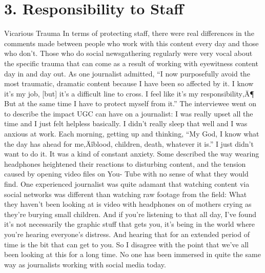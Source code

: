 \documentclass[symmetric, notoc, nobib]{towcenter-book}
\begin{document}
\section{3. Responsibility to Staff}
Vicarious Trauma
In terms of protecting staff, there were real differences in the comments
made between people who work with this content every day and those who
don't. Those who do social newsgathering regularly were very vocal about
the specific trauma that can come as a result of working with eyewitness
content day in and day out. As one journalist admitted, ``I now purposefully
avoid the most traumatic, dramatic content because I have been so affected
by it. I know it's my job, [but] it's a difficult line to cross. I feel like it's my
responsibility‚Ä¶ But at the same time I have to protect myself from it.'' The
interviewee went on to describe the impact UGC can have on a journalist:
I was really upset all the time and I just felt helpless basically. I didn't
really sleep that well and I was anxious at work. Each morning, getting
up and thinking, ``My God, I know what the day has ahead for
me‚Äîblood, children, death, whatever it is.'' I just didn't want to do it.
It was a kind of constant anxiety.
Some described the way wearing headphones heightened their reactions to
disturbing content, and the tension caused by opening video files on You-
Tube with no sense of what they would find. One experienced journalist was
quite adamant that watching content via social networks was different than
watching raw footage from the field:
What they haven't been looking at is video with headphones on of
mothers crying as they're burying small children. And if you're listening
to that all day, I've found it's not necessarily the graphic stuff
that gets you, it's being in the world where you're hearing everyone's
distress. And hearing that for an extended period of time is the bit
that can get to you. So I disagree with the point that we've all been
looking at this for a long time. No one has been immersed in quite
the same way as journalists working with social media today.
\end{document}
